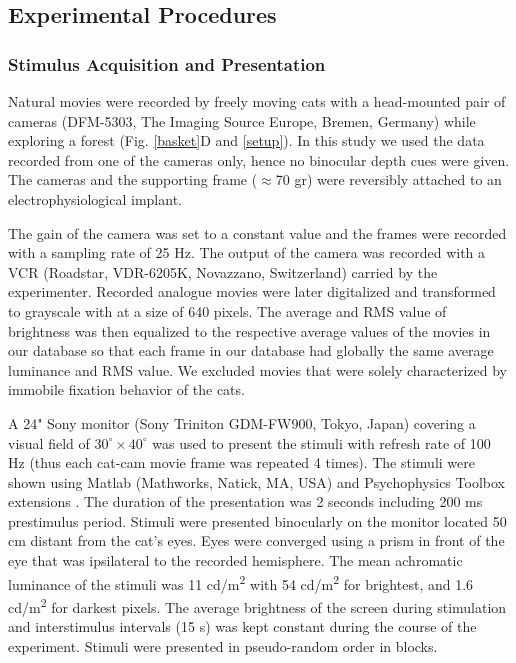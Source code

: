 \subsection{Experimental Procedures}


\subsubsection{Stimulus Acquisition and Presentation}

Natural movies were recorded by freely moving cats with a head-mounted pair
of cameras (DFM-5303, The Imaging Source Europe, Bremen, Germany) while
exploring a forest (Fig. \ref{basket}D and \ref{setup}). In this study we
used the data recorded from one of the cameras only, hence no binocular
depth cues were given. The cameras and the supporting frame ($\approx$70
gr) were reversibly attached to an electrophysiological implant.

The gain of the camera was set to a constant value and the frames were
recorded with a sampling rate of 25 Hz. The output of the camera was
recorded with a VCR (Roadstar, VDR-6205K, Novazzano, Switzerland) carried
by the experimenter. Recorded analogue movies were later digitalized and
transformed to grayscale with at a size of 640 pixels. The
average and RMS value of brightness was
then equalized to the respective average values of the movies in our
database so that each frame in our database had globally the same average
luminance and RMS value. We excluded movies that were solely characterized
by immobile fixation behavior of the cats.

A 24" Sony monitor (Sony Triniton GDM-FW900, Tokyo, Japan) covering a
visual field of $30^{\circ}\times40^{\circ}$ was used to present the
stimuli with refresh rate of 100 Hz (thus each cat-cam movie frame was
repeated 4 times). The stimuli were shown using Matlab (Mathworks, Natick,
MA, USA) and Psychophysics Toolbox extensions
\citep{brainard1997a,pelli1997a}. The duration of the presentation was 2
seconds including 200 ms prestimulus period. Stimuli were presented
binocularly on the monitor located 50 cm distant from the cat's eyes. Eyes
were converged using a prism in front of the eye that was ipsilateral to
the recorded hemisphere. The mean achromatic luminance of the stimuli was
11 cd/m\textsuperscript{2} with 54 cd/m\textsuperscript{2} for brightest,
and 1.6 cd/m\textsuperscript{2} for darkest pixels. The average brightness
of the screen during stimulation and interstimulus intervals (15 s) was
kept constant during the course of the experiment. Stimuli were presented
in pseudo-random order in blocks.

